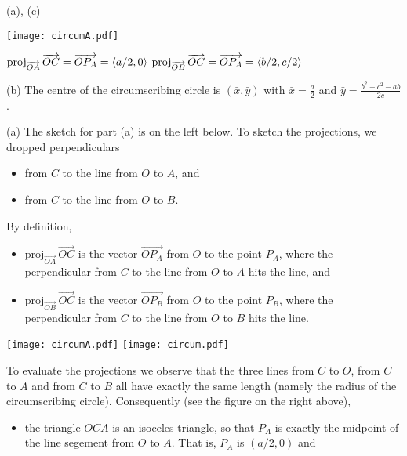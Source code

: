 \begin{answer}
(a), (c)
\begin{center}
     \texttt{[image: circumA.pdf]}
\end{center}
$\text{proj}_{\overrightarrow{\scriptstyle OA}}\,\overrightarrow{OC}
    =\overrightarrow{OP_A}=\left< a/2,0\right>$\qquad
$\text{proj}_{\overrightarrow{\scriptstyle OB}}\,\overrightarrow{OC}
    =\overrightarrow{OP_A}=\left< b/2,c/2\right>$

(b) The centre of the circumscribing circle is $(\bar x,\bar y)$ with
$\bar x=\frac{a}{2}$ and
$ \bar y =\frac{b^2+c^2-ab}{2c}$.
\end{answer}

\begin{solution}
(a) The sketch for part (a) is on the left below.
To sketch the projections, we dropped perpendiculars 
\begin{itemize}\itemsep1pt \parskip0pt  %
\item 
from $C$ to the line from $O$ to $A$, and 
\item 
from $C$ to the line from $O$ to $B$.
\end{itemize}
By definition, 
\begin{itemize}\itemsep1pt \parskip0pt  %
\item 
$\text{proj}_{\overrightarrow{\scriptstyle OA}}\,\overrightarrow{OC}$
is the vector $\overrightarrow{OP_A}$ from $O$ to the point $P_A$, where 
the perpendicular from $C$ to the line from $O$ to $A$ hits the line,
and 
\item 
$\text{proj}_{\overrightarrow{\scriptstyle OB}}\,\overrightarrow{OC}$
is the vector $\overrightarrow{OP_B}$ from $O$ to the point $P_B$, where 
the perpendicular from $C$ to the line from $O$ to $B$ hits the line.
\end{itemize}
\begin{center}
     \texttt{[image: circumA.pdf]}\qquad\qquad
     \texttt{[image: circum.pdf]}
\end{center}
To evaluate the projections we observe that the three lines from 
$C$ to $O$, from $C$ to $A$ and from $C$ to $B$ all have exactly the same length
(namely the radius of the circumscribing circle). Consequently
(see the figure on the right above),
\begin{itemize}\itemsep1pt \parskip0pt  %
\item 
the triangle $OCA$ is an isoceles triangle, so that $P_A$ is exactly the
midpoint of the line segement from $O$ to $A$. That is, $P_A$ is $(a/2,0)$ and

\end{itemize}
\end{solution}
